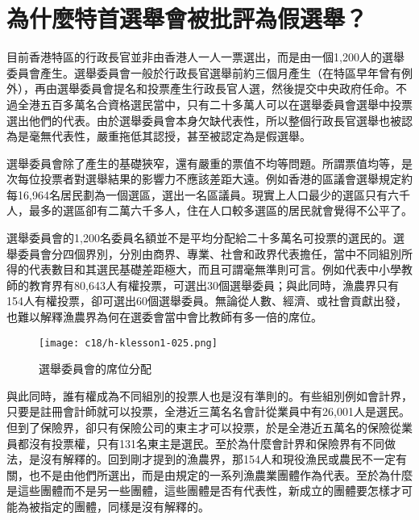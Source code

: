 \section{為什麼特首選舉會被批評為假選舉？}

目前香港特區的行政長官並非由香港人一人一票選出，而是由一個1,200人的選舉委員會產生。選舉委員會一般於行政長官選舉前約三個月產生（在特區早年曾有例外），再由選舉委員會提名和投票產生行政長官人選，然後提交中央政府任命。不過全港五百多萬名合資格選民當中，只有二十多萬人可以在選舉委員會選舉中投票選出他們的代表。由於選舉委員會本身欠缺代表性，所以整個行政長官選舉也被認為是毫無代表性，嚴重拖低其認授，甚至被認定為是假選舉。

選舉委員會除了產生的基礎狹窄，還有嚴重的票值不均等問題。所謂票值均等，是次每位投票者對選舉結果的影響力不應該差距大遠。例如香港的區議會選舉規定約每16,964名居民劃為一個選區，選出一名區議員。現實上人口最少的選區只有六千人，最多的選區卻有二萬六千多人，住在人口較多選區的居民就會覺得不公平了。

選舉委員會的1,200名委員名額並不是平均分配給二十多萬名可投票的選民的。選舉委員會分四個界別，分別由商界、專業、社會和政界代表擔任，當中不同組別所得的代表數目和其選民基礎差距極大，而且可謂毫無準則可言。例如代表中小學教師的教育界有80,643人有權投票，可選出30個選舉委員；與此同時，漁農界只有154人有權投票，卻可選出60個選舉委員。無論從人數、經濟、或社會貢獻出發，也難以解釋漁農界為何在選委會當中會比教師有多一倍的席位。

\begin{figure}[htbp]
    \centering
    \texttt{[image: c18/h-klesson1-025.png]}
    \caption{選舉委員會的席位分配} 
\end{figure}

與此同時，誰有權成為不同組別的投票人也是沒有準則的。有些組別例如會計界，只要是註冊會計師就可以投票，全港近三萬名名會計從業員中有26,001人是選民。但到了保險界，卻只有保險公司的東主才可以投票，於是全港近五萬名的保險從業員都沒有投票權，只有131名東主是選民。至於為什麼會計界和保險界有不同做法，是沒有解釋的。回到剛才提到的漁農界，那154人和現役漁民或農民不一定有關，也不是由他們所選出，而是由規定的一系列漁農業團體作為代表。至於為什麼是這些團體而不是另一些團體，這些團體是否有代表性，新成立的團體要怎樣才可能為被指定的團體，同樣是沒有解釋的。


